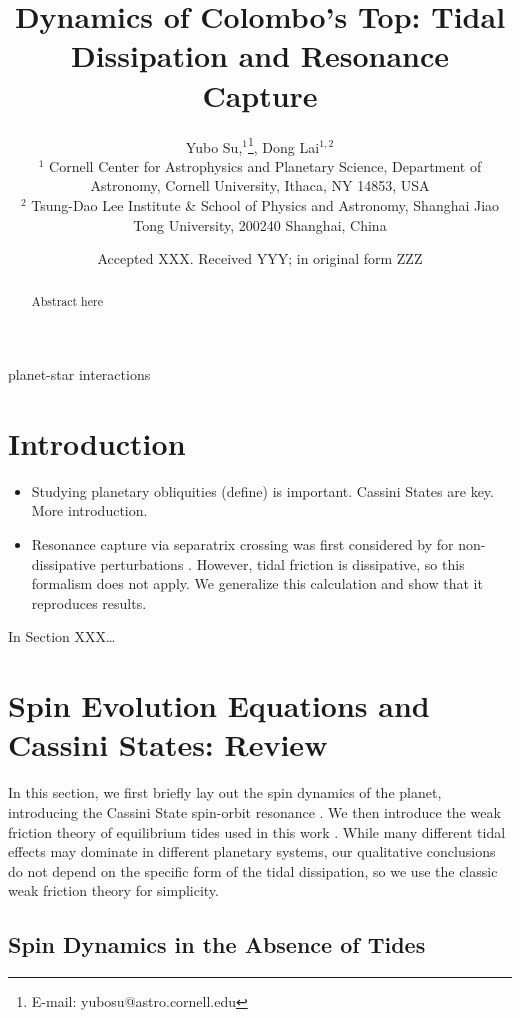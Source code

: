 \documentclass[
        fleqn,
        usenatbib,
    ]{mnras}
\title[Weak Tides and Cassini States]{Dynamics of Colombo's Top: Tidal
Dissipation and Resonance Capture}
\author[Y. Su and D. Lai.]{
Yubo Su,$^1$\thanks{E-mail: yubosu@astro.cornell.edu},
Dong Lai$^{1,2}$
\\
$^1$ Cornell Center for Astrophysics and Planetary Science, Department of
Astronomy, Cornell University, Ithaca, NY 14853, USA\\
$^2$ Tsung-Dao Lee Institute \& School of Physics and Astronomy, Shanghai Jiao
Tong University, 200240 Shanghai, China
}
\date{Accepted XXX\@. Received YYY\@; in original form ZZZ}
\begin{document}
\label{firstpage}
\pagerange{\pageref{firstpage}--\pageref{lastpage}}
\maketitle

\begin{abstract}
    Abstract here
\end{abstract}

\begin{keywords}
planet-star interactions
\end{keywords}

\section{Introduction}

\begin{itemize}
    \item Studying planetary obliquities (define) is important. Cassini States
        are key. More introduction.

    \item Resonance capture via separatrix crossing was first considered by
        \citep{henrard1982} for non-dissipative perturbations
        \citep[e.g.][]{su2020}. However, tidal friction is dissipative, so this
        formalism does not apply. We generalize this calculation and show that
        it reproduces results.
\end{itemize}

In Section XXX\dots

\section{Spin Evolution Equations and Cassini States: Review}\label{s:theory}

In this section, we first briefly lay out the spin dynamics of the planet,
introducing the Cassini State spin-orbit resonance \citep[for more details,
see][]{su2020}. We then introduce the weak friction theory of equilibrium tides
used in this work \citep{lai2012}. While many different tidal effects may
dominate in different planetary systems, our qualitative conclusions do not
depend on the specific form of the tidal dissipation, so we use the classic weak
friction theory for simplicity.

\subsection{Spin Dynamics in the Absence of Tides}\label{ss:theory_spin}
\end{document}
